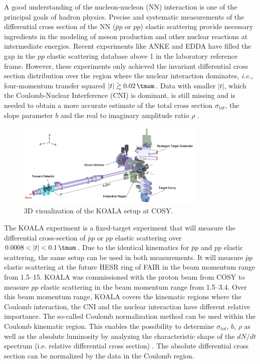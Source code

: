 \documentclass[number,5p]{elsarticle}
\begin{document}
A good understanding of the nucleon-nucleon (NN) interaction is one of the principal goals of hadron physics.
Precise and systematic measurements of the differential cross section of the
NN ($\bar{p}p$ or $pp$) elastic scattering provide necessary ingredients
in the modeling of meson production and other nuclear reactions at intermediate energies.
Recent experiments like ANKE \cite{ANKE} and EDDA \cite{EDDA} have filled the gap
in the $pp$ elastic scattering database above \SI{1}{\momentum} in the laboratory reference frame.
However, these experiments only achieved the invariant differential cross section distribution over the region where the nuclear interaction dominates, 
\textit{i.e.}, four-momentum transfer squared $|t| \gtrsim \SI{0.02}{\tmom}$.
Data with smaller \(|t|\), which the Coulomb-Nuclear Interference (CNI) is
dominant, is still missing and is needed to obtain a more accurate estimate of
the total cross section \({\sigma}_{tot}\), the slope parameter \(b\) and the
real to imaginary amplitude ratio \(\rho\) \cite{RevModPhys.57.563}.

\begin{figure}[htbp]
	\centering
	\includegraphics[width=0.8\textwidth]{./koala_setup.png}
	\caption{3D visualization of the KOALA setup at COSY.}
	\label{fig:setup}
\end{figure}

The KOALA experiment is a fixed-target experiment that will measure the
differential cross-section of $\bar{p}p$ or $pp$ elastic scattering
over $0.0008 < |t| < \SI{0.1}{\tmom}$.
Due to the identical kinematics for $\bar{p}p$ and $pp$ elastic scattering, the
same setup can be used in both measurements.
It will measure $\bar{p}p$ elastic
scattering at the future HESR ring of FAIR \cite{FAIR} in the beam momentum range from
\SIrange{1.5}{15}{\momentum}.
KOALA was commissioned with the proton beam from COSY \cite{COSY} to measure $pp$ elastic scattering in the beam momentum range from \SIrange{1.5}{3.4}{\momentum}.
Over this beam momentum range, KOALA covers the kinematic regions where the
Coulomb interaction, the CNI and the nuclear interaction have different relative importance.
The so-called Coulomb normalization method \cite{bernard1987real,jenni2008atlas}
can be used within the Coulomb kinematic region.
This enables the possibility to determine \({\sigma}_{tot}\), \(b\), \(\rho\) as well as
the absolute luminosity by analyzing the characteristic shape of the $dN/dt$
spectrum (i.e. relative differential cross section) \cite{koala_article}.
The absolute differential cross section can be normalized by the data in the
Coulomb region.
\end{document}
